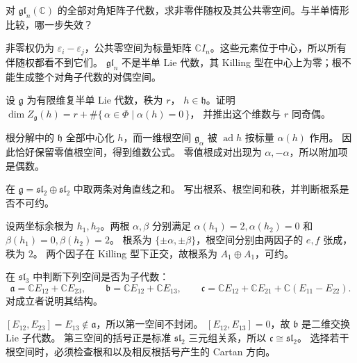 \begin{exercise}\label{b5:ex:16-reductive-center}
	对 \(\mathfrak{gl}_n(\mathbb C)\) 的全部对角矩阵子代数，求非零伴随权及其公共零空间。与半单情形比较，哪一步失效？
\end{exercise}
\begin{solution}
	非零权仍为 \(\varepsilon_i-\varepsilon_j\)，公共零空间为标量矩阵 \(\mathbb CI_n\)。这些元素位于中心，所以所有伴随权都看不到它们。 \(\mathfrak{gl}_n\) 不是半单 Lie 代数，其 Killing 型在中心上为零；根不能生成整个对角子代数的对偶空间。
\end{solution}

\begin{exercise}\label{b5:ex:16-centralizer-dimension}
	设 \(\mathfrak g\) 为有限维复半单 Lie 代数，秩为 \(r\)， \(h\in\mathfrak h\)。证明 \(\dim Z_{\mathfrak g}(h)=r+\#\bigl\{\,\alpha\in\Phi\mid\alpha(h)=0\,\bigr\}\)， 并推出这个维数与 \(r\) 同奇偶。
\end{exercise}
\begin{solution}
	根分解中的 \(\mathfrak h\) 全部中心化 \(h\)，而一维根空间 \(\mathfrak g_\alpha\) 被 \(\operatorname{ad}h\) 按标量 \(\alpha(h)\) 作用。 因此恰好保留零值根空间，得到维数公式。 零值根成对出现为 \(\alpha,-\alpha\)，所以附加项是偶数。
\end{solution}

\begin{exercise}\label{b5:ex:16-cartans-product}
	在 \(\mathfrak g=\mathfrak{sl}_2\oplus\mathfrak{sl}_2\) 中取两条对角直线之和。 写出根系、根空间和秩，并判断根系是否不可约。
\end{exercise}
\begin{solution}
	设两坐标余根为 \(h_1,h_2\)。两根 \(\alpha,\beta\) 分别满足 \(\alpha(h_1)=2,\alpha(h_2)=0\) 和 \(\beta(h_1)=0,\beta(h_2)=2\)。 根系为 \(\{\pm\alpha,\pm\beta\}\)，根空间分别由两因子的 \(e,f\) 张成，秩为 \(2\)。 两个因子在 Killing 型下正交，故根系为 \(A_1\oplus A_1\)，可约。
\end{solution}

\begin{exercise}\label{b5:ex:16-subalgebra-root-support}
	在 \(\mathfrak{sl}_3\) 中判断下列空间是否为子代数：
	\[
		\mathfrak a=\mathbb CE_{12}+\mathbb CE_{23},\qquad \mathfrak b=\mathbb CE_{12}+\mathbb CE_{13},\qquad \mathfrak c=\mathbb CE_{12}+\mathbb CE_{21}+\mathbb C(E_{11}-E_{22}).
	\]
	对成立者说明其结构。
\end{exercise}
\begin{solution}
	\([E_{12},E_{23}]=E_{13}\notin\mathfrak a\)，所以第一空间不封闭。 \([E_{12},E_{13}]=0\)，故 \(\mathfrak b\) 是二维交换 Lie 子代数。 第三空间的括号正是标准 \(\mathfrak{sl}_2\) 三元组关系，所以 \(\mathfrak c\cong\mathfrak{sl}_2\)。 选择若干根空间时，必须检查根和以及相反根括号产生的 Cartan 方向。
\end{solution}
